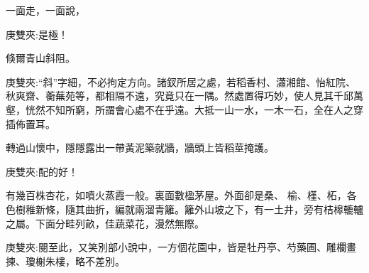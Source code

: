 \begin{parag}
    一面走，一面說，\begin{note}庚雙夾:是極！\end{note}倏爾青山斜阻。\begin{note}庚雙夾:“斜”字細，不必拘定方向。諸釵所居之處，若稻香村、瀟湘館、怡紅院、秋爽齋、蘅蕪苑等，都相隔不遠，究竟只在一隅。然處置得巧妙，使人見其千邱萬壑，恍然不知所窮，所謂會心處不在乎遠。大抵一山一水，一木一石，全在人之穿插佈置耳。\end{note}轉過山懷中，隱隱露出一帶黃泥築就牆，牆頭上皆稻莖掩護。\begin{note}庚雙夾:配的好！\end{note}有幾百株杏花，如噴火蒸霞一般。裏面數楹茅屋。外面卻是桑、 榆、槿、柘，各色樹稚新條，隨其曲折，編就兩溜青籬。籬外山坡之下，有一土井，旁有桔槔轆轤之屬。下面分畦列畝，佳蔬菜花，漫然無際。\begin{note}庚雙夾:閱至此，又笑別部小說中，一方個花園中，皆是牡丹亭、芍藥圃、雕欄畫揀、瓊榭朱樓，略不差別。\end{note}
\end{parag}


